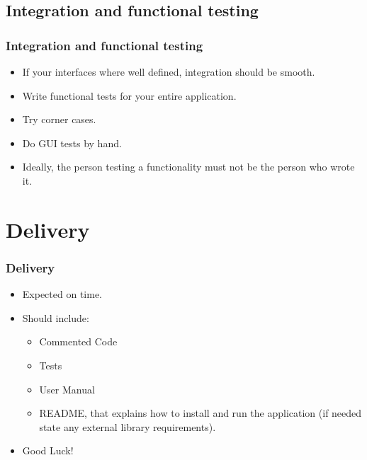 \documentclass[10pt]{beamer}
\begin{document}
\subsection{Integration and functional testing}
\begin{frame}
  \frametitle{Integration and functional testing}
  \begin{itemize}
  \item If your interfaces where well defined, integration should be smooth.
  \item Write functional tests for your entire application.
  \item Try corner cases.
  \item Do GUI tests by hand.
  \item Ideally, the person testing a functionality must not be the person who
    wrote it.
  \end{itemize}
\end{frame}

\section{Delivery}
\begin{frame}
\frametitle{Delivery}
\begin{itemize}
\item Expected on time.
\item Should include:
\begin{itemize}
  \item Commented Code
  \item Tests
  \item User Manual
  \item README, that explains how to install and run the application (if needed
    state any external library requirements).
\end{itemize}
\item Good Luck!
\end{itemize}
\end{frame}
\end{document}
